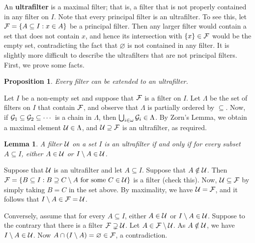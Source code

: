 \documentclass[10pt]{article}
\makeatletter
\theoremstyle{newstyle}
\newtheorem{lemma}[thm]{Lemma}
\newtheorem{prop}[thm]{Proposition}
\newenvironment{pf}[1][\proofname]{\par
  \pushQED{\qed}%
  \normalfont \topsep0\p@\relax
  \trivlist
  \item[\hskip\labelsep\scshape
  #1\@addpunct{.}]\ignorespaces
}{%
  \popQED\endtrivlist\@endpefalse
}
\makeatother
\begin{document}
An {\bf ultrafilter} is a maximal filter; that is, a filter that is not properly contained in 
any filter on $I$. Note that every principal filter is an ultrafilter. 
To see this, let ${\cal F} = \{A \subseteq I : x \in A\}$ be a principal filter.
Then any larger filter would contain a set that does not contain $x$, 
and hence its intersection with $\{x\} \in {\cal F}$ would be the empty set, 
contradicting the fact that $\varnothing$ is not contained in any filter. 
It is slightly more difficult to describe the ultrafilters that are not principal filters. 
First, we prove some facts.

\begin{prop}
Every filter can be extended to an ultrafilter.
\end{prop}
\begin{pf}
Let $I$ be a non-empty set and suppose that ${\cal F}$ is a filter on $I$. Let 
$\Lambda$ be the set of filters on $I$ that contain ${\cal F}$, and observe that 
$\Lambda$ is partially ordered by $\subseteq$. Now, if ${\cal G}_1 \subseteq {\cal G}_2 
\subseteq \cdots$ is a chain in $\Lambda$, then $\bigcup_{i \in \omega} {\cal G}_i \in \Lambda$.
By Zorn's Lemma, we obtain a maximal element ${\cal U} \in \Lambda$, and 
${\cal U} \supseteq {\cal F}$ is an ultrafilter, as required.
\end{pf}

\begin{lemma}
A filter ${\cal U}$ on a set $I$ is an ultrafilter if and only if for every subset $A \subseteq I$, 
either $A \in {\cal U}$ or $I \setminus A \in {\cal U}$. 
\end{lemma}
\begin{pf}
Suppose that ${\cal U}$ is an ultrafilter and let $A \subseteq I$. Suppose that $A \notin {\cal U}$.
Then ${\cal F} = \{B \subseteq I : B \supseteq C \setminus A \text{ for some } 
C \in {\cal U}\}$ is a filter (check this). Now, ${\cal U} \subseteq {\cal F}$ by simply
taking $B = C$ in the set above. By maximality, we have ${\cal U} = {\cal F}$, 
and it follows that $I \setminus A \in {\cal F} = {\cal U}$. 

Conversely, assume that for every $A \subseteq I$, either $A \in {\cal U}$ or 
$I \setminus A \in {\cal U}$. Suppose to the contrary that there is a 
filter ${\cal F} \supsetneq {\cal U}$. Let $A \in {\cal F} \setminus {\cal U}$. 
As $A \notin {\cal U}$, we have $I \setminus A \in {\cal U}$. Now 
$A \cap (I \setminus A) = \varnothing \in {\cal F}$, a contradiction.
\end{pf}
\end{document}
